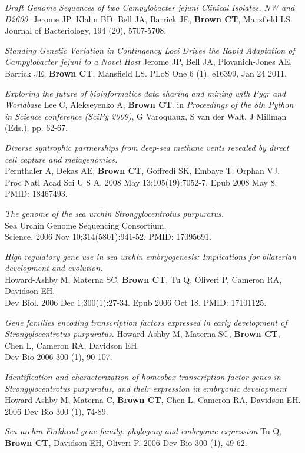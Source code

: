 \documentclass[margin,line]{resume}
\begin{document}
\begin{resume}
{\em Draft Genome Sequences of two Campylobacter jejuni Clinical Isolates,
NW and D2600.} Jerome JP, Klahn BD, Bell JA, Barrick JE, {\bf Brown CT}, Mansfield LS. Journal of Bacteriology, 194 (20), 5707-5708.

{\em Standing Genetic Variation in Contingency Loci Drives the Rapid
  Adaptation of Campylobacter jejuni to a Novel Host} Jerome JP, Bell
JA, Plovanich-Jones AE, Barrick JE, {\bf Brown CT}, Mansfield LS.  PLoS One 6
(1), e16399, Jan 24 2011.

{\em Exploring the future of bioinformatics data sharing and mining
  with Pygr and Worldbase} Lee C, Alekseyenko A, {\bf Brown CT}.  in {\em
  Proceedings of the 8th Python in Science conference (SciPy 2009)}, G
Varoquaux, S van der Walt, J Millman (Eds.), pp. 62-67.

{\em Diverse syntrophic partnerships from deep-sea methane vents revealed by direct cell capture and metagenomics.}\\
Pernthaler A, Dekas AE, {\bf Brown CT}, Goffredi SK, Embaye T, Orphan VJ.\\
Proc Natl Acad Sci U S A. 2008 May
13;105(19):7052-7. Epub 2008 May 8.  PMID: 18467493.

{\em The genome of the sea urchin Strongylocentrotus purpuratus.}\\
Sea Urchin Genome Sequencing Consortium.\\
Science. 2006 Nov 10;314(5801):941-52.
PMID: 17095691.

{\em High regulatory gene use in sea urchin embryogenesis: Implications for bilaterian development and evolution.}\\
Howard-Ashby M, Materna SC, {\bf Brown CT}, Tu Q, Oliveri P, Cameron RA, Davidson EH.\\
Dev Biol. 2006 Dec 1;300(1):27-34. Epub 2006 Oct 18.
PMID: 17101125.

{\em Gene families encoding transcription factors expressed in early development of Strongylocentrotus purpuratus.}
Howard-Ashby M, Materna SC, {\bf Brown CT}, Chen L, Cameron RA, Davidson EH.\\
Dev Bio 2006 300 (1), 90-107.

{\em Identification and characterization of homeobox transcription factor genes in Strongylocentrotus purpuratus, and their expression in embryonic development}
Howard-Ashby M, Materna C, {\bf Brown CT}, Chen L, Cameron RA, Davidson EH.
2006 Dev Bio 300 (1), 74-89.

{\em Sea urchin Forkhead gene family: phylogeny and embryonic expression}
Tu Q, {\bf Brown CT}, Davidson EH, Oliveri P.
2006 Dev Bio 300 (1), 49-62.


\end{resume}
\end{document}

